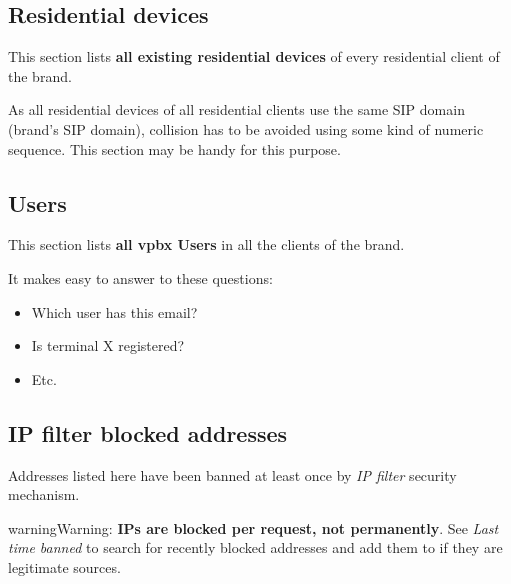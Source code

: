 \documentclass[letterpaper,10pt,english]{sphinxmanual}
\begin{document}
\subsection{Residential devices}
\label{administration_portal/brand/views/residential_devices::doc}\label{administration_portal/brand/views/residential_devices:residential-devices}
This section lists \textbf{all existing residential devices} of every residential client of the brand.

As all residential devices of all residential clients use the same SIP domain (brand's SIP domain), collision has to be
avoided using some kind of numeric sequence. This section may be handy for this purpose.


\subsection{Users}
\label{administration_portal/brand/views/users::doc}\label{administration_portal/brand/views/users:users}
This section lists \textbf{all vpbx Users} in all the clients of the brand.

It makes easy to answer to these questions:
\begin{itemize}
\item {} 
Which user has this email?

\item {} 
Is terminal X registered?

\item {} 
Etc.

\end{itemize}


\subsection{IP filter blocked addresses}
\label{administration_portal/brand/views/ipfilter_blocked_addresses:ip-filter-blocked-addresses}\label{administration_portal/brand/views/ipfilter_blocked_addresses::doc}
Addresses listed here have been banned at least once by \emph{IP filter} security mechanism.

\begin{notice}{warning}{Warning:}
\textbf{IPs are blocked per request, not permanently}. See \emph{Last time banned} to search for recently blocked
addresses and add them to {\hyperref[security_and_maintenance/security/authorized_ip_ranges:authorized\string-ip\string-ranges]{}} if they are legitimate sources.
\end{notice}
\end{document}
